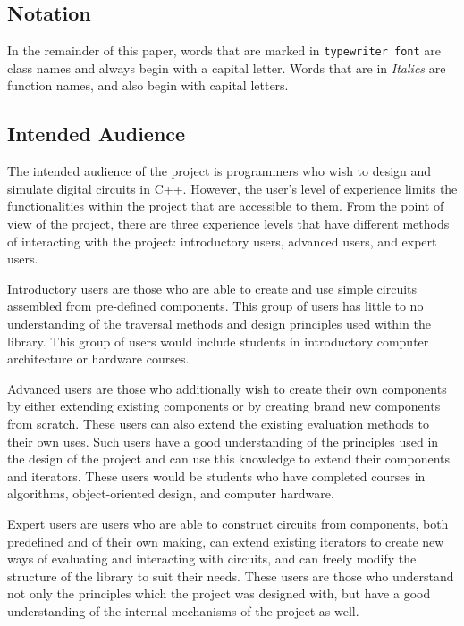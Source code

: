 \documentclass{article}
\newcommand{\ClassName}[1]{\texttt{#1}}
\newcommand{\FunctionName}[1]{\textit{#1}}
\begin{document}
\subsection{Notation}

In the remainder of this paper, words that are marked in \ClassName{typewriter font} are class names and always begin with a capital letter. Words that are in \FunctionName{Italics} are function names, and also begin with capital letters.

\subsection{Intended Audience}

The intended audience of the project is programmers who wish to design and simulate digital circuits in C++. However, the user's level of experience limits the functionalities within the project that are accessible to them. From the point of view of the project, there are three experience levels that have different methods of interacting with the project: introductory users, advanced users, and expert users.

Introductory users are those who are able to create and use simple circuits assembled from pre-defined components. This group of users has little to no understanding of the traversal methods and design principles used within the library. This group of users would include students in introductory computer architecture or hardware courses.

Advanced users are those who additionally wish to create their own components by either extending existing components or by creating brand new components from scratch. These users can also extend the existing evaluation methods to their own uses. Such users have a good understanding of the principles used in the design of the project and can use this knowledge to extend their components and iterators. These users would be students who have completed courses in algorithms, object-oriented design, and computer hardware.

Expert users are users who are able to construct circuits from components, both predefined and of their own making, can extend existing iterators to create new ways of evaluating and interacting with circuits, and can freely modify the structure of the library to suit their needs. These users are those who understand not only the principles which the project was designed with, but have a good understanding of the internal mechanisms of the project as well.
\end{document}
